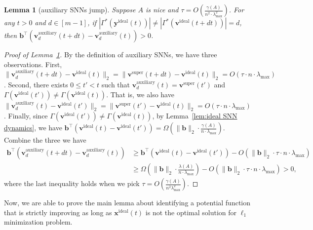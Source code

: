\documentclass[11pt]{article}
\newtheorem{lemma}{Lemma}[section]
\theoremstyle{remark}
\theoremstyle{definition}
\newcommand{\by}{\mathbf{y}}
\newcommand{\bx}{\mathbf{x}}
\newcommand{\bb}{\mathbf{b}}
\newcommand{\bv}{\mathbf{v}}
\begin{document}
\begin{lemma}[auxiliary SNNs jump]\label{lem:auxiliary SNN jump}
	Suppose $A$ is nice and $\tau=O(\frac{\gamma(A)}{n^2\cdot\lambda_{\max}^2})$. For any $t>0$ and $d\in[m-1]$, if $|\Gamma^*(\by^\text{ideal}(t))|\neq|\Gamma^*(\bv^\text{ideal}(t+dt))|=d$, then $\bb^\top\left(\bv^\text{auxiliary}_d(t+dt)-\bv^\text{auxiliary}_d(t)\right)>0$.
\end{lemma}
\begin{proof}[Proof of Lemma~\ref{lem:auxiliary SNN jump}]
	By the definition of auxiliary SNNs, we have three observations. First, $\|\bv^\text{auxiliary}_d(t+dt)-\bv^\text{ideal}(t)\|_2=\|\bv^\text{super}(t+dt)-\bv^\text{ideal}(t)\|_2=O(\tau\cdot n\cdot\lambda_{\max})$. Second, there exists $0\leq t'<t$ such that $\bv^\text{auxiliary}_d(t)=\bv^\text{super}(t')$ and $\Gamma(\bv^\text{ideal}(t'))\neq\Gamma(\bv^\text{ideal}(t))$. That is, we also have $\|\bv^\text{auxiliary}_d(t)-\bv^\text{ideal}(t')\|_2=\|\bv^\text{super}(t')-\bv^\text{ideal}(t)\|_2=O(\tau\cdot n\cdot\lambda_{\max})$. Finally, since $\Gamma(\bv^\text{ideal}(t'))\neq\Gamma(\bv^\text{ideal}(t))$, by Lemma~\ref{lem:ideal SNN dynamics}, we have $\bb^\top\left(\bv^\text{ideal}(t)-\bv^\text{ideal}(t')\right)=\Omega(\|\bb\|_2\cdot\frac{\gamma(A)}{n\cdot\lambda_{\max}})$. Combine the three we have 
	\begin{align*}
	\bb^\top\left(\bv^\text{auxiliary}_d(t+dt)-\bv^\text{auxiliary}_d(t)\right)&\geq\bb^\top\left(\bv^\text{ideal}(t)-\bv^\text{ideal}(t')\right) - O(\|\bb\|_2\cdot\tau\cdot n\cdot\lambda_{\max})\\
	&\geq\Omega(\|\bb\|_2\cdot\frac{\lambda(A)}{n\cdot\lambda_{\max}}) - O(\|\bb\|_2\cdot\tau\cdot n\cdot\lambda_{\max})>0,
	\end{align*}
	where the last inequality holds when we pick $\tau=O(\frac{\gamma(A)}{n^2\lambda_{\max}^2})$.
\end{proof}

Now, we are able to prove the main lemma about identifying a potential function that is strictly improving as long as $\bx^\text{ideal}(t)$ is not the optimal solution for $\ell_1$ minimization problem.
\end{document}
